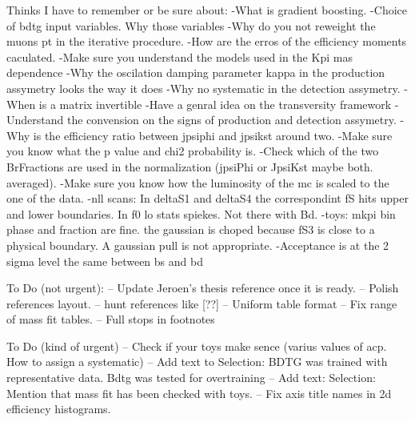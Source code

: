 
Thinks I have to remember or be sure about:
-What is gradient boosting.
-Choice of bdtg input variables. Why those variables
-Why do you not reweight the muons pt in the iterative procedure.
-How are the erros of the efficiency moments caculated.
-Make sure you understand the models used in the Kpi mas dependence
-Why the oscilation damping parameter kappa in the production assymetry looks the way it does 
-Why no systematic in the detection assymetry.
-When is a matrix invertible
-Have a genral idea on the transversity framework
-Understand the convension on the signs of production and detection assymetry.
-Why is the efficiency ratio between jpsiphi and jpsikst around two.
-Make sure you know what the p value and chi2 probability is.
-Check which of the two BrFractions are used in the normalization (jpsiPhi or JpsiKst maybe both. averaged).
-Make sure you know how the luminosity of the mc is scaled to the one of the data.
-nll scans: 
    In deltaS1 and deltaS4 the correspondint fS hits upper and lower boundaries.
    In f0 lo stats spiekes. Not there with Bd. 
-toys:
    mkpi bin phase and fraction are fine. the gaussian is choped because fS3 is close to a physical boundary. A gaussian pull is not appropriate.
-Acceptance is at the 2 sigma level the same between bs and bd

To Do (not urgent):
-- Update Jeroen's thesis reference once it is ready.
-- Polish references layout.
-- hunt references like [??]
-- Uniform table format
-- Fix range of mass fit tables.
-- Full stops in footnotes



To Do (kind of urgent)
-- Check if your toys make sence (varius values of acp. How to assign a systematic)
-- Add text to Selection: BDTG was trained with representative data. Bdtg was tested for overtraining
-- Add text: Selection: Mention that mass fit has been checked with toys.
-- Fix axis title names in 2d efficiency histograms.

